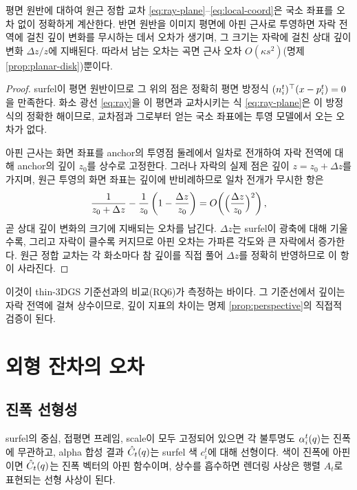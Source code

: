 \begin{proposition}
\label{prop:perspective}
평면 원반에 대하여 원근 정합 교차 \eqref{eq:ray-plane}--\eqref{eq:local-coord}은 국소
좌표를 오차 없이 정확하게 계산한다. 반면 원반을 이미지 평면에 아핀 근사로 투영하면
자락 전역에 걸친 깊이 변화를 무시하는 데서 오차가 생기며, 그 크기는 자락에 걸친 상대
깊이 변화 $\Delta z/z$에 지배된다. 따라서 남는 오차는 곡면 근사 오차
$O(\kappa s^2)$(명제 \ref{prop:planar-disk})뿐이다.
\end{proposition}

\begin{proof}
surfel이 평면 원반이므로 그 위의 점은 정확히 평면 방정식
$(n^t_i)^{\top}(x-p^t_i)=0$을 만족한다. 화소 광선 \eqref{eq:ray}을 이 평면과
교차시키는 식 \eqref{eq:ray-plane}은 이 방정식의 정확한 해이므로, 교차점과 그로부터
얻는 국소 좌표에는 투영 모델에서 오는 오차가 없다.

아핀 근사는 화면 좌표를 anchor의 투영점 둘레에서 일차로 전개하여 자락 전역에 대해
anchor의 깊이 $z_0$를 상수로 고정한다. 그러나 자락의 실제 점은 깊이 $z = z_0+\Delta z$를
가지며, 원근 투영의 화면 좌표는 깊이에 반비례하므로 일차 전개가 무시한 항은
\[
  \frac{1}{z_0+\Delta z} - \frac{1}{z_0}\left(1-\frac{\Delta z}{z_0}\right)
  = O\!\left(\Bigl(\frac{\Delta z}{z_0}\Bigr)^2\right),
\]
곧 상대 깊이 변화의 크기에 지배되는 오차를 남긴다. $\Delta z$는 surfel이 광축에 대해
기울수록, 그리고 자락이 클수록 커지므로 아핀 오차는 가파른 각도와 큰 자락에서
증가한다. 원근 정합 교차는 각 화소마다 참 깊이를 직접 풀어 $\Delta z$를 정확히
반영하므로 이 항이 사라진다.
\end{proof}

이것이 thin-3DGS 기준선과의 비교(RQ6)가 측정하는 바이다. 그 기준선에서 깊이는 자락
전역에 걸쳐 상수이므로, 깊이 지표의 차이는 명제 \ref{prop:perspective}의 직접적
검증이 된다.

\section{외형 잔차의 오차}
\label{sec:residual-error}

\subsection{진폭 선형성}

\begin{proposition}
\label{prop:linearity}
surfel의 중심, 접평면 프레임, scale이 모두 고정되어 있으면 각 불투명도
$\alpha^t_i(q)$는 진폭에 무관하고, alpha 합성 결과 $\hat{C}_t(q)$는 surfel 색 $c^t_i$에
대해 선형이다. 색이 진폭에 아핀이면 $\hat{C}_t(q)$는 진폭 벡터의 아핀 함수이며, 상수를
흡수하면 렌더링 사상은 행렬 $A_t$로 표현되는 선형 사상이 된다.
\end{proposition}

